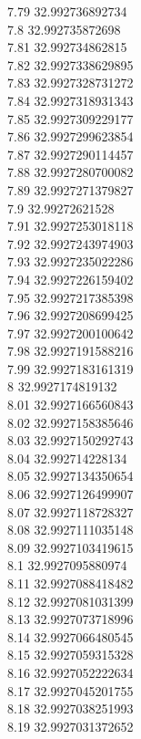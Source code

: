 {7.79	32.992736892734\\
7.8	32.992735872698\\
7.81	32.992734862815\\
7.82	32.9927338629895\\
7.83	32.9927328731272\\
7.84	32.9927318931343\\
7.85	32.9927309229177\\
7.86	32.9927299623854\\
7.87	32.9927290114457\\
7.88	32.9927280700082\\
7.89	32.9927271379827\\
7.9	32.99272621528\\
7.91	32.9927253018118\\
7.92	32.9927243974903\\
7.93	32.9927235022286\\
7.94	32.9927226159402\\
7.95	32.9927217385398\\
7.96	32.9927208699425\\
7.97	32.9927200100642\\
7.98	32.9927191588216\\
7.99	32.9927183161319\\
8	32.9927174819132\\
8.01	32.9927166560843\\
8.02	32.9927158385646\\
8.03	32.9927150292743\\
8.04	32.992714228134\\
8.05	32.9927134350654\\
8.06	32.9927126499907\\
8.07	32.9927118728327\\
8.08	32.9927111035148\\
8.09	32.9927103419615\\
8.1	32.9927095880974\\
8.11	32.9927088418482\\
8.12	32.9927081031399\\
8.13	32.9927073718996\\
8.14	32.9927066480545\\
8.15	32.9927059315328\\
8.16	32.9927052222634\\
8.17	32.9927045201755\\
8.18	32.9927038251993\\
8.19	32.9927031372652\\
}
